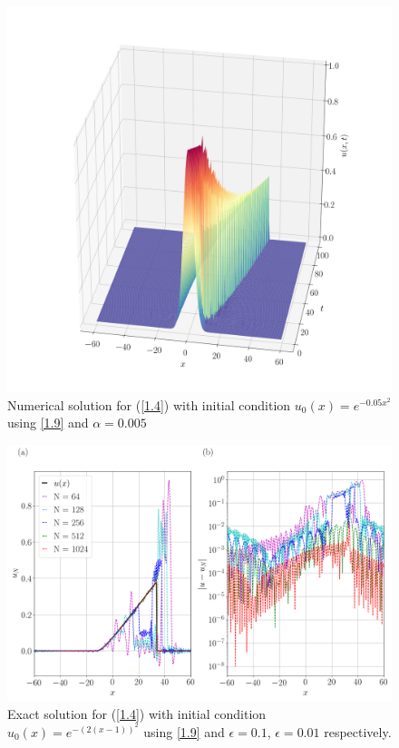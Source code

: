 	\begin{figure}
		\includegraphics[width=\textwidth]{Figures/Galerkin/Graphics/eps=0.005/Numerical_Solution_alpha=0005.png}
		\caption{Numerical solution for (\ref{1.4}) with initial condition $u_0 (x) = e^{- 0.05 x^2}$ using \ref{1.9} and $\alpha = 0.005$}
		\label{Exact_Solution}
	\end{figure}
	\begin{figure}
		\includegraphics[width=\textwidth]{Figures/Galerkin/Graphics/eps=0.005/Numerical_Solution_alpha=0005_T=100.png}
		\caption{Exact solution for (\ref{1.4}) with initial condition $u_0 (x) = e^{-(2(x - 1))^2}$ using \ref{1.9} and $\epsilon = 0.1$, $\epsilon = 0.01$ respectively.}
		\label{Exact_Solution}
	\end{figure}
